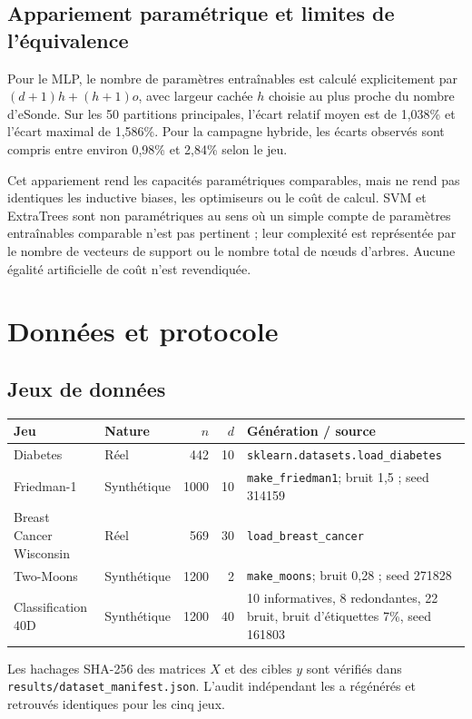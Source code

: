 \documentclass[11pt,a4paper]{article}
\begin{document}
\subsection{Appariement paramétrique et limites de l'équivalence}
Pour le MLP, le nombre de paramètres entraînables est calculé explicitement par $(d+1)h+(h+1)o$, avec largeur cachée $h$ choisie au plus proche du nombre d'eSonde. Sur les 50 partitions principales, l'écart relatif moyen est de 1,038\% et l'écart maximal de 1,586\%. Pour la campagne hybride, les écarts observés sont compris entre environ 0,98\% et 2,84\% selon le jeu.

Cet appariement rend les capacités paramétriques comparables, mais ne rend pas identiques les inductive biases, les optimiseurs ou le coût de calcul. SVM et ExtraTrees sont non paramétriques au sens où un simple compte de paramètres entraînables comparable n'est pas pertinent ; leur complexité est représentée par le nombre de vecteurs de support ou le nombre total de nœuds d'arbres. Aucune égalité artificielle de coût n'est revendiquée.

\section{Données et protocole}
\subsection{Jeux de données}
\begin{longtable}{p{4.0cm}p{2.1cm}r r p{4.2cm}}
\toprule Jeu & Nature & $n$ & $d$ & Génération / source \\
\midrule
\endhead
Diabetes & Réel & 442 & 10 & \texttt{sklearn.datasets.load\_diabetes}\\
Friedman-1 & Synthétique & 1000 & 10 & \texttt{make\_friedman1}; bruit 1,5 ; seed 314159\\
Breast Cancer Wisconsin & Réel & 569 & 30 & \texttt{load\_breast\_cancer}\\
Two-Moons & Synthétique & 1200 & 2 & \texttt{make\_moons}; bruit 0,28 ; seed 271828\\
Classification 40D & Synthétique & 1200 & 40 & 10 informatives, 8 redondantes, 22 bruit, bruit d'étiquettes 7\%, seed 161803\\
\bottomrule
\end{longtable}
Les hachages SHA-256 des matrices $X$ et des cibles $y$ sont vérifiés dans \texttt{results/dataset\_manifest.json}. L'audit indépendant les a régénérés et retrouvés identiques pour les cinq jeux.
\end{document}
